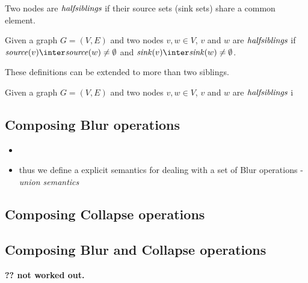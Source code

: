 \documentclass{elsarticle}
\begin{document}
Two nodes are $\halfsiblings$ if their source sets (sink sets) share a common element.  

\begin{definition}[$\halfsiblings$] \label{def:fullsiblings}
  Given a graph $G = (V,E)$ and two nodes $v,w \in V$, $v$ and $w$ are $\halfsiblings$ if $\source(v) \inter \source(w) \ne \emptyset$ and $\sink(v) \inter \sink(w) \ne \emptyset$. 
\end{definition}

These definitions can be extended to more than two siblings. 


\begin{definition}
  Given a graph $G = (V,E)$ and two nodes $v,w \in V$, $v$ and $w$ are $\halfsiblings$ i
\end{definition}



\subsection{Composing Blur operations}
  
  	\begin{itemize}
	\item {}
	\item thus we define a explicit semantics for dealing with a set of Blur operations -  \textit{union semantics}
\end{itemize}


  \subsection{Composing Collapse operations}

  	
  \subsection{Composing Blur and Collapse operations}  
		
	\mnote\textbf{{?? not worked out.} }
\end{document}
